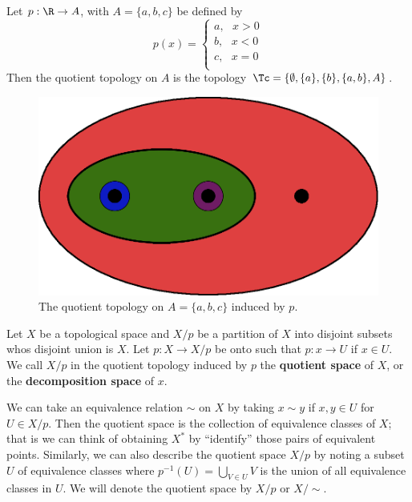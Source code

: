 \begin{example}
    Let $p:\R \rightarrow A$, with  $A=\{a,b,c\}$ be defined by
        \begin{equation*}
            p(x)=\begin{cases}
                    a, \text{ } x>0 \\
                    b, \text{ } x<0 \\
                    c, \text{ } x=0 \\
                \end{cases}
        \end{equation*}
    Then the quotient topology on $A$ is the topology  $\Tc=\{\emptyset, \{a\}, \{b\}, \{a,b\},A\}$.

    \begin{figure}[h]
        \centering
        \includegraphics[scale = 0.5]{Figures/Chapter2/quotient_on_three.eps}
        \caption{The quotient topology on $A=\{a,b,c\}$ induced by $p$.}
    \end{figure}
\end{example}

\begin{definition}
    Let $X$ be a topological space and  $X/p$ be a partition of  $X$ into disjoint subsets whos
    disjoint union is  $X$. Let  $p:X \rightarrow X/p$ be onto such that  $p:x \rightarrow U$ if  $x
    \in U$. We call  $X/p$ in the quotient topology induced by $p$ the \textbf{quotient space} of $X$, or the
    \textbf{decomposition space} of $x$.
\end{definition}

We can take an equivalence relation $\sim$ on  $X$ by taking  $x \sim y$ if  $x,y \in U$ for  $U \in
X/p$. Then the quotient space is the collection of equivalence classes of $X$; that is we can think
of obtaining $X^*$ by ``identify'' those pairs of equivalent points. Similarly, we can also describe
the quotient space $X/p$ by noting a subset $U$ of equivalence classes where $p^{-1}(U)=\bigcup_{V
\in U}{V}$ is the union of all equivalence classes in $U$. We will denote the quotient space by
$X/p$ or  $X/\sim$.


